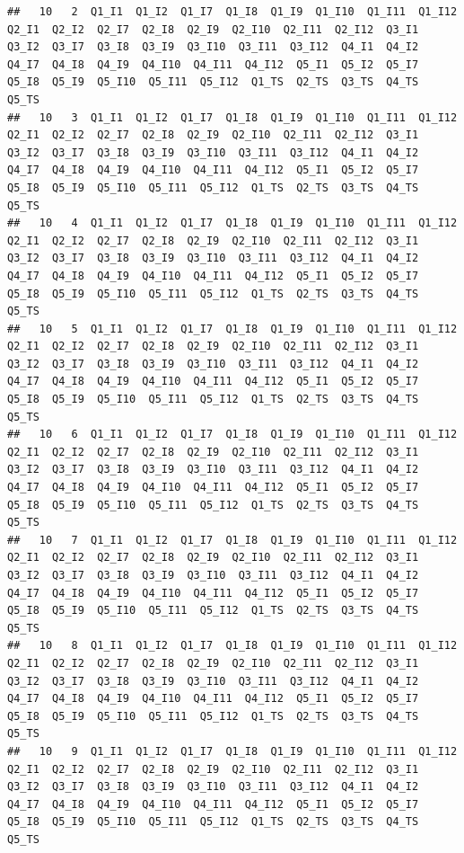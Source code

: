 \documentclass[]{book}
\begin{document}
\begin{verbatim}
##   10   2  Q1_I1  Q1_I2  Q1_I7  Q1_I8  Q1_I9  Q1_I10  Q1_I11  Q1_I12  Q2_I1  Q2_I2  Q2_I7  Q2_I8  Q2_I9  Q2_I10  Q2_I11  Q2_I12  Q3_I1  Q3_I2  Q3_I7  Q3_I8  Q3_I9  Q3_I10  Q3_I11  Q3_I12  Q4_I1  Q4_I2  Q4_I7  Q4_I8  Q4_I9  Q4_I10  Q4_I11  Q4_I12  Q5_I1  Q5_I2  Q5_I7  Q5_I8  Q5_I9  Q5_I10  Q5_I11  Q5_I12  Q1_TS  Q2_TS  Q3_TS  Q4_TS  Q5_TS
##   10   3  Q1_I1  Q1_I2  Q1_I7  Q1_I8  Q1_I9  Q1_I10  Q1_I11  Q1_I12  Q2_I1  Q2_I2  Q2_I7  Q2_I8  Q2_I9  Q2_I10  Q2_I11  Q2_I12  Q3_I1  Q3_I2  Q3_I7  Q3_I8  Q3_I9  Q3_I10  Q3_I11  Q3_I12  Q4_I1  Q4_I2  Q4_I7  Q4_I8  Q4_I9  Q4_I10  Q4_I11  Q4_I12  Q5_I1  Q5_I2  Q5_I7  Q5_I8  Q5_I9  Q5_I10  Q5_I11  Q5_I12  Q1_TS  Q2_TS  Q3_TS  Q4_TS  Q5_TS
##   10   4  Q1_I1  Q1_I2  Q1_I7  Q1_I8  Q1_I9  Q1_I10  Q1_I11  Q1_I12  Q2_I1  Q2_I2  Q2_I7  Q2_I8  Q2_I9  Q2_I10  Q2_I11  Q2_I12  Q3_I1  Q3_I2  Q3_I7  Q3_I8  Q3_I9  Q3_I10  Q3_I11  Q3_I12  Q4_I1  Q4_I2  Q4_I7  Q4_I8  Q4_I9  Q4_I10  Q4_I11  Q4_I12  Q5_I1  Q5_I2  Q5_I7  Q5_I8  Q5_I9  Q5_I10  Q5_I11  Q5_I12  Q1_TS  Q2_TS  Q3_TS  Q4_TS  Q5_TS
##   10   5  Q1_I1  Q1_I2  Q1_I7  Q1_I8  Q1_I9  Q1_I10  Q1_I11  Q1_I12  Q2_I1  Q2_I2  Q2_I7  Q2_I8  Q2_I9  Q2_I10  Q2_I11  Q2_I12  Q3_I1  Q3_I2  Q3_I7  Q3_I8  Q3_I9  Q3_I10  Q3_I11  Q3_I12  Q4_I1  Q4_I2  Q4_I7  Q4_I8  Q4_I9  Q4_I10  Q4_I11  Q4_I12  Q5_I1  Q5_I2  Q5_I7  Q5_I8  Q5_I9  Q5_I10  Q5_I11  Q5_I12  Q1_TS  Q2_TS  Q3_TS  Q4_TS  Q5_TS
##   10   6  Q1_I1  Q1_I2  Q1_I7  Q1_I8  Q1_I9  Q1_I10  Q1_I11  Q1_I12  Q2_I1  Q2_I2  Q2_I7  Q2_I8  Q2_I9  Q2_I10  Q2_I11  Q2_I12  Q3_I1  Q3_I2  Q3_I7  Q3_I8  Q3_I9  Q3_I10  Q3_I11  Q3_I12  Q4_I1  Q4_I2  Q4_I7  Q4_I8  Q4_I9  Q4_I10  Q4_I11  Q4_I12  Q5_I1  Q5_I2  Q5_I7  Q5_I8  Q5_I9  Q5_I10  Q5_I11  Q5_I12  Q1_TS  Q2_TS  Q3_TS  Q4_TS  Q5_TS
##   10   7  Q1_I1  Q1_I2  Q1_I7  Q1_I8  Q1_I9  Q1_I10  Q1_I11  Q1_I12  Q2_I1  Q2_I2  Q2_I7  Q2_I8  Q2_I9  Q2_I10  Q2_I11  Q2_I12  Q3_I1  Q3_I2  Q3_I7  Q3_I8  Q3_I9  Q3_I10  Q3_I11  Q3_I12  Q4_I1  Q4_I2  Q4_I7  Q4_I8  Q4_I9  Q4_I10  Q4_I11  Q4_I12  Q5_I1  Q5_I2  Q5_I7  Q5_I8  Q5_I9  Q5_I10  Q5_I11  Q5_I12  Q1_TS  Q2_TS  Q3_TS  Q4_TS  Q5_TS
##   10   8  Q1_I1  Q1_I2  Q1_I7  Q1_I8  Q1_I9  Q1_I10  Q1_I11  Q1_I12  Q2_I1  Q2_I2  Q2_I7  Q2_I8  Q2_I9  Q2_I10  Q2_I11  Q2_I12  Q3_I1  Q3_I2  Q3_I7  Q3_I8  Q3_I9  Q3_I10  Q3_I11  Q3_I12  Q4_I1  Q4_I2  Q4_I7  Q4_I8  Q4_I9  Q4_I10  Q4_I11  Q4_I12  Q5_I1  Q5_I2  Q5_I7  Q5_I8  Q5_I9  Q5_I10  Q5_I11  Q5_I12  Q1_TS  Q2_TS  Q3_TS  Q4_TS  Q5_TS
##   10   9  Q1_I1  Q1_I2  Q1_I7  Q1_I8  Q1_I9  Q1_I10  Q1_I11  Q1_I12  Q2_I1  Q2_I2  Q2_I7  Q2_I8  Q2_I9  Q2_I10  Q2_I11  Q2_I12  Q3_I1  Q3_I2  Q3_I7  Q3_I8  Q3_I9  Q3_I10  Q3_I11  Q3_I12  Q4_I1  Q4_I2  Q4_I7  Q4_I8  Q4_I9  Q4_I10  Q4_I11  Q4_I12  Q5_I1  Q5_I2  Q5_I7  Q5_I8  Q5_I9  Q5_I10  Q5_I11  Q5_I12  Q1_TS  Q2_TS  Q3_TS  Q4_TS  Q5_TS

\end{verbatim}
\end{document}
